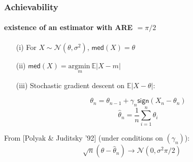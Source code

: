 \documentclass[mathserif]{beamer}
\newcommand{\sgn}{\mathsf{sign}}
\begin{document}
\begin{frame}
\frametitle{Achievability}
\framesubtitle{existence of an estimator with ARE $= \pi/2$}
\pause
\begin{itemize}
\item[(i)] For $X \sim \mathcal{N}(\theta,\sigma^2)$, $\mathsf{med}(X) = \theta$ 
\pause
\item[(ii)] $\mathsf{med}(X) = \underset{m}{ \mathrm{argmin~}} \mathbb E \left|X-m \right|$
\pause
\item[(iii)] Stochastic gradient descent on $\mathbb E \left| X-\theta \right|$:
\pause
\begin{flushright}
\end{flushright}
\[
\theta_n = \theta_{n-1} + \gamma_n \sgn(X_n - \theta_n)
\]
\[
\widehat{\theta}_n = \frac{1}{n} \sum_{i=1}^n \theta_i 
\]
\end{itemize}
\bigskip
\pause
From [Polyak \& Juditsky '92] (under conditions on $(\gamma_n)$): 
\[
\sqrt{n}(\theta- \widehat{\theta}_n) \rightarrow \mathcal N\left(0, \sigma^2 \pi /2 \right)
\]
\end{frame}

%
%
%
\end{document}
